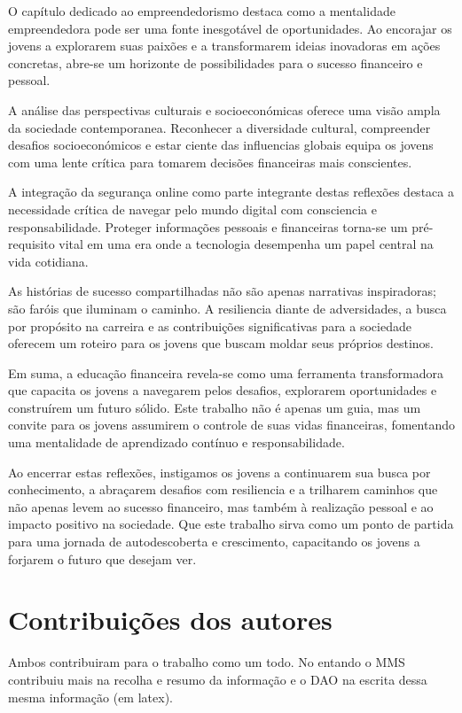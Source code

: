 \documentclass{report}
\begin{document}
O capítulo dedicado ao empreendedorismo destaca como a mentalidade empreendedora pode ser uma fonte inesgotável de oportunidades. Ao encorajar os jovens a explorarem suas paixões e a transformarem ideias inovadoras em ações concretas, abre-se um horizonte de possibilidades para o sucesso financeiro e pessoal.

A análise das perspectivas culturais e socioeconómicas oferece uma visão ampla da sociedade contemporanea. Reconhecer a diversidade cultural, compreender desafios socioeconómicos e estar ciente das influencias globais equipa os jovens com uma lente crítica para tomarem decisões financeiras mais conscientes.

A integração da segurança online como parte integrante destas reflexões destaca a necessidade crítica de navegar pelo mundo digital com consciencia e responsabilidade. Proteger informações pessoais e financeiras torna-se um pré-requisito vital em uma era onde a tecnologia desempenha um papel central na vida cotidiana.

As histórias de sucesso compartilhadas não são apenas narrativas inspiradoras; são faróis que iluminam o caminho. A resiliencia diante de adversidades, a busca por propósito na carreira e as contribuições significativas para a sociedade oferecem um roteiro para os jovens que buscam moldar seus próprios destinos.

Em suma, a educação financeira revela-se como uma ferramenta transformadora que capacita os jovens a navegarem pelos desafios, explorarem oportunidades e construírem um futuro sólido. Este trabalho não é apenas um guia, mas um convite para os jovens assumirem o controle de suas vidas financeiras, fomentando uma mentalidade de aprendizado contínuo e responsabilidade.

Ao encerrar estas reflexões, instigamos os jovens a continuarem sua busca por conhecimento, a abraçarem desafios com resiliencia e a trilharem caminhos que não apenas levem ao sucesso financeiro, mas também à realização pessoal e ao impacto positivo na sociedade. Que este trabalho sirva como um ponto de partida para uma jornada de autodescoberta e crescimento, capacitando os jovens a forjarem o futuro que desejam ver.


\chapter*{Contribuições dos autores}
Ambos contribuiram para o trabalho como um todo. No entando o MMS contribuiu mais na recolha e resumo da informação e o DAO na escrita dessa mesma informação (em latex).
\end{document}
